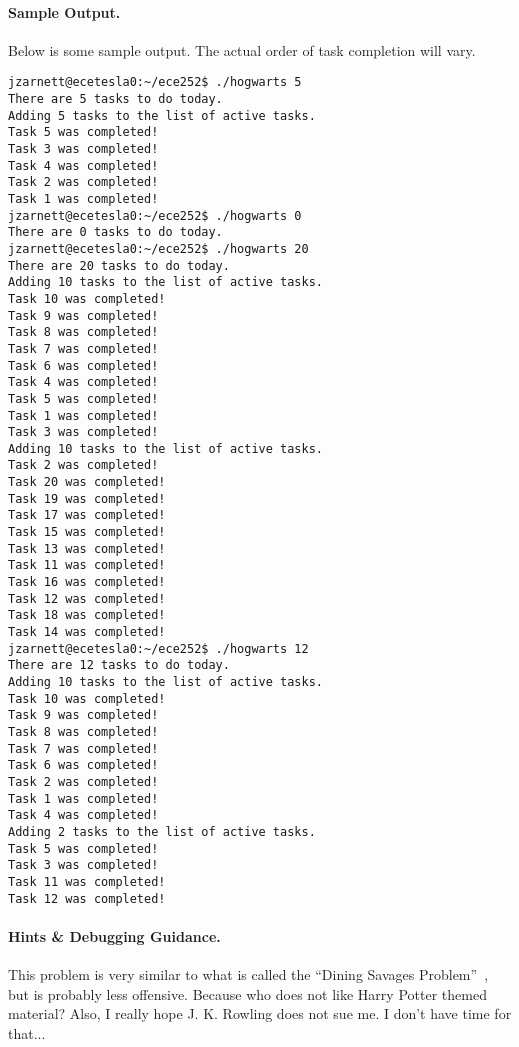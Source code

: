 \paragraph{Sample Output.} Below is some sample output. The actual order of task completion will vary.
{\small
\begin{verbatim}
jzarnett@ecetesla0:~/ece252$ ./hogwarts 5
There are 5 tasks to do today.
Adding 5 tasks to the list of active tasks.
Task 5 was completed!
Task 3 was completed!
Task 4 was completed!
Task 2 was completed!
Task 1 was completed!
jzarnett@ecetesla0:~/ece252$ ./hogwarts 0
There are 0 tasks to do today.
jzarnett@ecetesla0:~/ece252$ ./hogwarts 20
There are 20 tasks to do today.
Adding 10 tasks to the list of active tasks.
Task 10 was completed!
Task 9 was completed!
Task 8 was completed!
Task 7 was completed!
Task 6 was completed!
Task 4 was completed!
Task 5 was completed!
Task 1 was completed!
Task 3 was completed!
Adding 10 tasks to the list of active tasks.
Task 2 was completed!
Task 20 was completed!
Task 19 was completed!
Task 17 was completed!
Task 15 was completed!
Task 13 was completed!
Task 11 was completed!
Task 16 was completed!
Task 12 was completed!
Task 18 was completed!
Task 14 was completed!
jzarnett@ecetesla0:~/ece252$ ./hogwarts 12
There are 12 tasks to do today.
Adding 10 tasks to the list of active tasks.
Task 10 was completed!
Task 9 was completed!
Task 8 was completed!
Task 7 was completed!
Task 6 was completed!
Task 2 was completed!
Task 1 was completed!
Task 4 was completed!
Adding 2 tasks to the list of active tasks.
Task 5 was completed!
Task 3 was completed!
Task 11 was completed!
Task 12 was completed!
\end{verbatim}
}


\paragraph{Hints \& Debugging Guidance.}
This problem is very similar to what is called the ``Dining Savages Problem''~\cite{lbs}, but is probably less offensive. Because who does not like Harry Potter themed material? Also, I really hope J. K. Rowling does not sue me. I don't have time for that...

